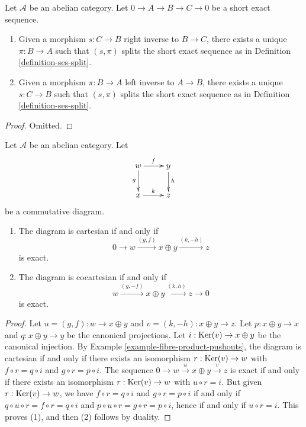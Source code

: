 \begin{lemma}
\label{lemma-ses-split}
Let $\mathcal{A}$ be an abelian category.
Let $0 \to A \to B \to C \to 0$
be a short exact sequence.
\begin{enumerate}
\item Given a morphism $s : C \to B$ right
inverse to
$B \to C$, there exists a unique $\pi : B \to
A$
such that $(s, \pi)$ splits the short exact
sequence
as in Definition \ref{definition-ses-split}.
\item Given a morphism $\pi : B \to A$ left
inverse to
$A \to B$, there exists a unique $s : C \to
B$
such that $(s, \pi)$ splits the short exact
sequence
as in Definition \ref{definition-ses-split}.
\end{enumerate}
\end{lemma}

\begin{proof}
Omitted.
\end{proof}

\begin{lemma}
\label{lemma-characterize-cartesian}
Let $\mathcal{A}$ be an abelian category. Let
$$
\xymatrix{
w\ar[r]^f\ar[d]_g
& y\ar[d]^h\\
x\ar[r]^k
& z
}
$$
be a commutative diagram.
\begin{enumerate}
\item The diagram is cartesian if and only if
$$
0 \to w \xrightarrow{(g, f)} x \oplus y
\xrightarrow{(k, -h)} z
$$
is exact.
\item The diagram is cocartesian if and only
if
$$
w \xrightarrow{(g, -f)} x \oplus y
\xrightarrow{(k, h)} z \to 0
$$
is exact.
\end{enumerate}
\end{lemma}

\begin{proof}
Let $u = (g, f) : w \to x \oplus y$ and $v =
(k, -h) : x \oplus y \to z$.
Let $p : x \oplus y \to x$ and $q : x \oplus
y \to y$ be the canonical
projections. Let $i : \mathop{\mathrm{Ker}}(v) \to x \oplus y$
be the canonical
injection. By Example
\ref{example-fibre-product-pushouts}, the
diagram is
cartesian if and only if there exists an
isomorphism
$r : \mathop{\mathrm{Ker}}(v) \to w$ with $f \circ r = q \circ
i$ and
$g \circ r = p \circ i$. The sequence
$0 \to w \overset{u} \to x \oplus y
\overset{v} \to z$ is exact if and
only if there exists an isomorphism $r :
\mathop{\mathrm{Ker}}(v) \to w$ with
$u \circ r = i$. But given $r : \mathop{\mathrm{Ker}}(v) \to
w$, we have
$f \circ r = q \circ i$ and $g \circ r = p
\circ i$ if and
only if $q \circ u \circ r= f \circ r = q
\circ i$ and
$p \circ u \circ r = g \circ r = p \circ i$,
hence if and only if
$u \circ r = i$. This proves (1), and then
(2) follows by duality.
\end{proof}

